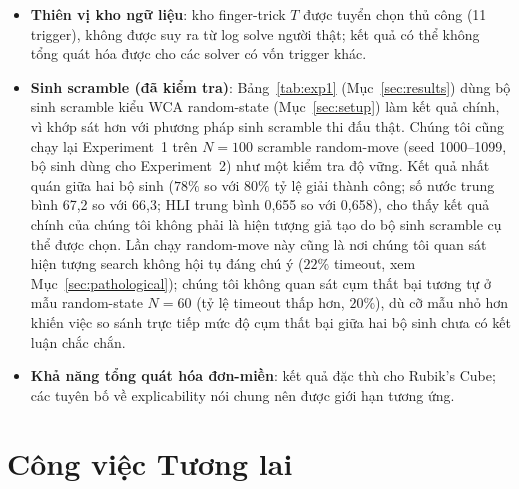 \documentclass[10pt,conference]{article}
\begin{document}
\begin{itemize}
    điểm trung bình dùng trong tương quan RQ-V1 độ tin cậy cao
    (ICC(2,k)$=0,91$) --- tương quan RQ-V1 nên được đọc như tương
    quan với một giá trị trung bình nhóm ổn định, không phải với đánh
    giá của một giám khảo đơn lẻ nào. \emph{Ghi chú: các số ICC này ban
    đầu lấy từ bản viết khảo sát; đã được tính lại độc lập từ ma trận
    đánh giá thô theo từng giám khảo (28 file CSV thật, xem
    \texttt{research/phase3\_survey/compute\_icc.py}), khớp chính xác:
    ICC(2,1)$=0,2563$, ICC(2,k)$=0,9061$.}
  \item \textbf{Thiên vị kho ngữ liệu}: kho finger-trick $T$ được tuyển
    chọn thủ công (11 trigger), không được suy ra từ log solve người
    thật; kết quả có thể không tổng quát hóa được cho các solver có vốn
    trigger khác.
  \item \textbf{Sinh scramble (đã kiểm tra)}: Bảng~\ref{tab:exp1}
    (Mục~\ref{sec:results}) dùng bộ sinh scramble kiểu WCA
    random-state (Mục~\ref{sec:setup}) làm kết quả chính, vì khớp sát
    hơn với phương pháp sinh scramble thi đấu thật. Chúng tôi cũng
    chạy lại Experiment~1 trên $N=100$ scramble random-move (seed
    1000--1099, bộ sinh dùng cho Experiment~2) như một kiểm tra độ
    vững. Kết quả nhất quán giữa hai bộ sinh ($78\%$ so với $80\%$ tỷ
    lệ giải thành công; số nước trung bình 67,2 so với 66,3; HLI
    trung bình 0,655 so với 0,658), cho thấy kết quả chính của chúng
    tôi không phải là hiện tượng giả tạo do bộ sinh scramble cụ thể
    được chọn. Lần chạy random-move này cũng là nơi chúng tôi quan sát
    hiện tượng search không hội tụ đáng chú ý ($22\%$ timeout, xem
    Mục~\ref{sec:pathological}); chúng tôi không quan sát cụm thất bại
    tương tự ở mẫu random-state $N=60$ (tỷ lệ timeout thấp hơn,
    $20\%$), dù cỡ mẫu nhỏ hơn khiến việc so sánh trực tiếp mức độ
    cụm thất bại giữa hai bộ sinh chưa có kết luận chắc chắn.
  \item \textbf{Khả năng tổng quát hóa đơn-miền}: kết quả đặc thù cho
    Rubik's Cube; các tuyên bố về explicability nói chung nên được giới
    hạn tương ứng.
\end{itemize}

\section{Công việc Tương lai}
\label{sec:future}
\end{document}
